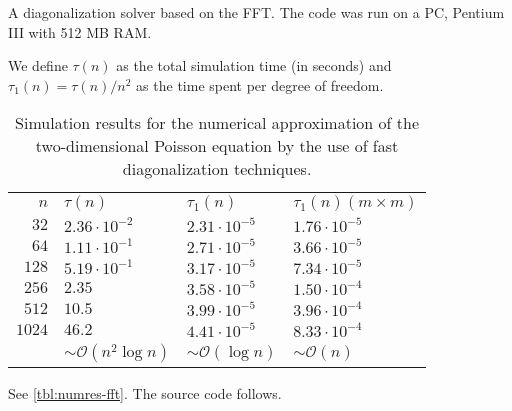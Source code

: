 A diagonalization solver based on the FFT. The code was run on a PC, Pentium III
with 512 MB RAM.

We define $\tau(n)$ as the total simulation time (in seconds) and $\tau_1(n) =
\tau(n)/n^2$ as the time spent per degree of freedom.

\begin{table}[h]
  \caption{
    Simulation results for the numerical approximation of the two-dimensional
    Poisson equation by the use of fast diagonalization techniques.
  }
  \label{tbl:numres-fft}
  \begin{center}
    \bgroup{}
    \begin{tabular}{r|lll}
      \hline
      $n$ & $\tau(n)$ & $\tau_1(n)$ & $\tau_1(n) (m \times m)$ \\
      \hhline{====}
      $32$ & $2.36 \cdot 10^{-2}$ & $2.31 \cdot 10^{-5}$ & $1.76 \cdot 10^{-5}$ \\
      $64$ & $1.11 \cdot 10^{-1}$ & $2.71 \cdot 10^{-5}$ & $3.66 \cdot 10^{-5}$ \\
      $128$ & $5.19 \cdot 10^{-1}$ & $3.17 \cdot 10^{-5}$ & $7.34 \cdot 10^{-5}$ \\
      $256$ & $2.35$ & $3.58 \cdot 10^{-5}$ & $1.50 \cdot 10^{-4}$ \\
      $512$ & $10.5$ & $3.99 \cdot 10^{-5}$ & $3.96 \cdot 10^{-4}$ \\
      $1024$ & $46.2$ & $4.41 \cdot 10^{-5}$ & $8.33 \cdot 10^{-4}$ \\
      \hline
      & $\sim \mathcal{O}(n^2 \log n)$ & $\sim \mathcal{O}(\log n)$ & $\sim \mathcal{O}(n) $ \\
      \hline
    \end{tabular}
    \egroup
  \end{center}

\end{table}

See \autoref{tbl:numres-fft}. The source code follows.

